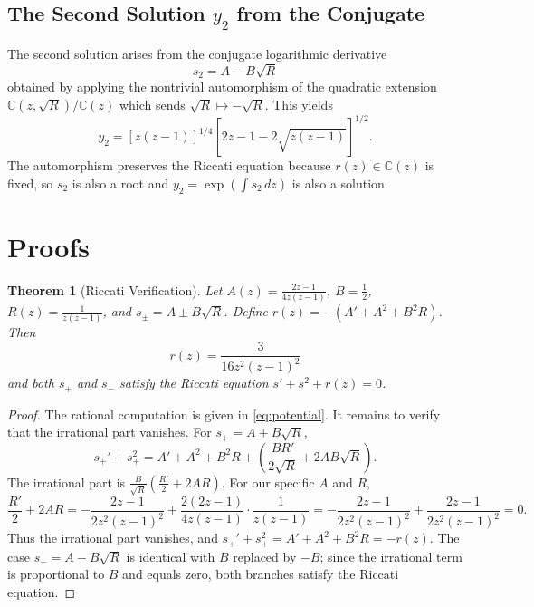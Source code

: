 \documentclass[11pt,a4paper]{article}
\newtheorem{theorem}{Theorem}
\theoremstyle{definition}
\begin{document}
\subsection{The Second Solution \(y_2\) from the Conjugate}
The second solution arises from the conjugate logarithmic derivative
\begin{equation}
s_2 = A - B\sqrt{R} \label{eq:logder2}
\end{equation}
obtained by applying the nontrivial automorphism of the quadratic extension \(\mathbb{C}(z, \sqrt{R})/\mathbb{C}(z)\) which sends \(\sqrt{R} \mapsto -\sqrt{R}\). This yields
\begin{equation}
y_2 = [z(z-1)]^{1/4}[2z-1 - 2\sqrt{z(z-1)}]^{1/2}. \label{eq:sol2}
\end{equation}
The automorphism preserves the Riccati equation because \(r(z) \in \mathbb{C}(z)\) is fixed, so \(s_2\) is also a root and \(y_2 = \exp(\int s_2\,dz)\) is also a solution.

\section{Proofs}

\begin{theorem}[Riccati Verification]
Let \(A(z) = \frac{2z-1}{4z(z-1)}\), \(B = \frac{1}{2}\), \(R(z) = \frac{1}{z(z-1)}\), and \(s_{\pm} = A \pm B\sqrt{R}\). Define \(r(z) = -(A' + A^2 + B^2R)\). Then
\begin{equation*}
r(z) = \frac{3}{16z^2(z-1)^2}
\end{equation*}
and both \(s_{+}\) and \(s_{-}\) satisfy the Riccati equation \(s' + s^2 + r(z) = 0\).
\end{theorem}

\begin{proof}
The rational computation is given in \eqref{eq:potential}. It remains to verify that the irrational part vanishes. For \(s_{+} = A + B\sqrt{R}\),
\begin{equation*}
s_{+}' + s_{+}^2 = A' + A^2 + B^2R + \left(\frac{BR'}{2\sqrt{R}} + 2AB\sqrt{R}\right).
\end{equation*}
The irrational part is \(\frac{B}{\sqrt{R}}\left(\frac{R'}{2} + 2AR\right)\). For our specific \(A\) and \(R\),
\begin{equation*}
\frac{R'}{2} + 2AR = -\frac{2z-1}{2z^2(z-1)^2} + \frac{2(2z-1)}{4z(z-1)}\cdot\frac{1}{z(z-1)} = -\frac{2z-1}{2z^2(z-1)^2} + \frac{2z-1}{2z^2(z-1)^2} = 0.
\end{equation*}
Thus the irrational part vanishes, and \(s_{+}' + s_{+}^2 = A' + A^2 + B^2R = -r(z)\). The case \(s_{-} = A - B\sqrt{R}\) is identical with \(B\) replaced by \(-B\); since the irrational term is proportional to \(B\) and equals zero, both branches satisfy the Riccati equation.
\end{proof}
\end{document}
